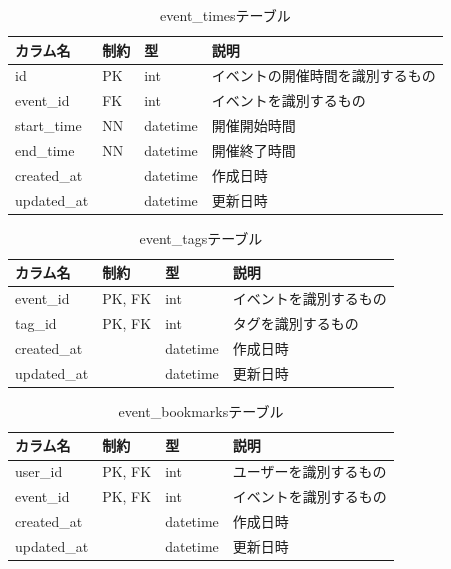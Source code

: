 \begin{table}[H]
  \centering
  \caption{event\_timesテーブル}
  \label{tab:db-event-times}
  \begin{tabular}{|l|l|l|l|} \hline
    カラム名        & 制約 & 型        & 説明               \\ \hline \hline
    id          & PK & int      & イベントの開催時間を識別するもの \\ \hline
    event\_id   & FK & int      & イベントを識別するもの      \\ \hline
    start\_time & NN & datetime & 開催開始時間           \\ \hline
    end\_time   & NN & datetime & 開催終了時間           \\ \hline
    created\_at &    & datetime & 作成日時             \\ \hline
    updated\_at &    & datetime & 更新日時             \\ \hline
  \end{tabular}
\end{table}

\begin{table}[H]
  \centering
  \caption{event\_tagsテーブル}
  \label{tab:db-event-tags}
  \begin{tabular}{|l|l|l|l|} \hline
    カラム名        & 制約     & 型        & 説明          \\ \hline \hline
    event\_id   & PK, FK & int      & イベントを識別するもの \\ \hline
    tag\_id     & PK, FK & int      & タグを識別するもの   \\ \hline
    created\_at &        & datetime & 作成日時        \\ \hline
    updated\_at &        & datetime & 更新日時        \\ \hline
  \end{tabular}
\end{table}

\begin{table}[H]
  \centering
  \caption{event\_bookmarksテーブル}
  \label{tab:db-event-bookmarks}
  \begin{tabular}{|l|l|l|l|} \hline
    カラム名        & 制約     & 型        & 説明          \\ \hline \hline
    user\_id    & PK, FK & int      & ユーザーを識別するもの \\ \hline
    event\_id   & PK, FK & int      & イベントを識別するもの \\ \hline
    created\_at &        & datetime & 作成日時        \\ \hline
    updated\_at &        & datetime & 更新日時        \\ \hline
  \end{tabular}
\end{table}

